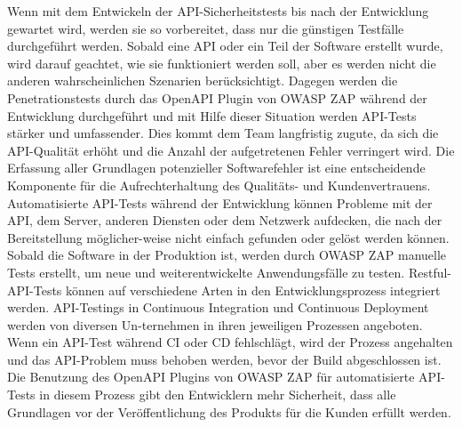 Wenn mit dem Entwickeln der API-Sicherheitstests bis nach der Entwicklung gewartet wird, werden sie so vorbereitet, dass nur die günstigen Testfälle durchgeführt werden. Sobald eine API oder ein Teil der Software erstellt wurde, wird darauf geachtet, wie sie funktioniert werden soll, aber es werden nicht die anderen wahrscheinlichen Szenarien berücksichtigt. Dagegen werden die Penetrationstests durch das OpenAPI Plugin von OWASP ZAP während der Entwicklung durchgeführt und mit Hilfe dieser Situation werden API-Tests stärker und umfassender. Dies kommt dem Team langfristig zugute, da sich die API-Qualität erhöht und die Anzahl der aufgetretenen Fehler verringert wird. Die Erfassung aller Grundlagen potenzieller Softwarefehler ist eine entscheidende Komponente für die Aufrechterhaltung des Qualitäts- und Kundenvertrauens. Automatisierte API-Tests während der Entwicklung können Probleme mit der API, dem Server, anderen Diensten oder dem Netzwerk aufdecken, die nach der Bereitstellung möglicher-weise nicht einfach gefunden oder gelöst werden können. Sobald die Software in der Produktion ist, werden durch OWASP ZAP manuelle Tests erstellt, um neue und weiterentwickelte Anwendungsfälle zu testen. Restful-API-Tests können auf verschiedene Arten in den Entwicklungsprozess integriert werden. API-Testings in Continuous Integration und Continuous Deployment werden von diversen Un-ternehmen in ihren jeweiligen Prozessen angeboten. Wenn ein API-Test während CI oder CD fehlschlägt, wird der Prozess angehalten und das API-Problem muss behoben werden, bevor der Build abgeschlossen ist. Die Benutzung des OpenAPI Plugins von OWASP ZAP für automatisierte API-Tests in diesem Prozess gibt den Entwicklern mehr Sicherheit, dass alle Grundlagen vor der Veröffentlichung des Produkts für die Kunden erfüllt werden\cite{restcaseapiimportance16}.
